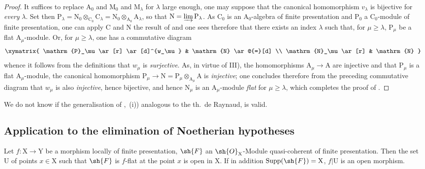 \begin{proof}
It suffices to replace $\mathrm{A}_0$ and $\mathrm{M}_0$ and $\mathrm{M}_\lambda$ for $\lambda$ large enough, one may suppose that the canonical homomorphism $v_\lambda$ is bijective for \emph{every} $\lambda$. Set then $\mathrm{P}_\lambda=\mathrm{N}_0\otimes_{\mathrm{C}_0}\mathrm{C}_\lambda=\mathrm{N}_0\otimes_{\mathrm{A}_0}\mathrm{A}_\lambda$, so that $\mathrm{N}=\varinjlim\mathrm{P}_\lambda$. As $\mathrm{C}_0$ is an $\mathrm{A}_0$-algebra of finite presentation and $\mathrm{P}_0$ a $\mathrm{C}_0$-module of finite presentation, one can apply $\mathrm{C}$ and $\mathrm{N}$ the result of  and one sees therefore that there exists an index $\lambda$ such that, for $\mu\geqslant\lambda$, $\mathrm{P}_\mu$ be a flat $\mathrm{A}_\mu$-module. Or, for $\mu\geqslant\lambda$, one has a commutative diagram
\[
\xymatrix{
  \mathrm{P}_\mu \ar[r] \ar[d]^{w_\mu} & \mathrm{N} \ar@{=}[d] \\
  \mathrm{N}_\mu \ar[r] & \mathrm{N}
}
\]
whence it follows from the definitions that $w_\mu$ is \emph{surjective}. As, in virtue of III), the homomorphisms $\mathrm{A}_\mu\to\mathrm{A}$ are injective and that $\mathrm{P}_\mu$ is a flat $\mathrm{A}_\mu$-module, the canonical homomorphism $\mathrm{P}_\mu\to\mathrm{N}=\mathrm{P}_\mu\otimes_{\mathrm{A}_\mu}\mathrm{A}$ is \emph{injective}; one concludes therefore from the preceding commutative diagram that $w_\mu$ is also \emph{injective}, hence bijective, and hence $\mathrm{N}_\mu$ is an $\mathrm{A}_\mu$-module \emph{flat} for $\mu\geqslant\lambda$, which completes the proof of .
\end{proof}

\begin{remark}[11.2.10]
\label{IV.11.2.10}
We do not know if the generalisation of ,~(i)) analogous to the th.~de Raynaud, is valid.
\end{remark}

\subsection{Application to the elimination of Noetherian hypotheses}
\label{subsection:IV.11.3}


\begin{theorem}[11.3.1]
\label{IV.11.3.1}
Let $f:\mathrm{X}\to\mathrm{Y}$ be a morphism locally of finite presentation, $\sh{F}$ an $\sh{O}_\mathrm{X}$-Module quasi-coherent of finite presentation. Then the set $\mathrm{U}$ of points $x\in\mathrm{X}$ such that $\sh{F}$ is $f$-flat at the point $x$ is open in $\mathrm{X}$. If in addition $\operatorname{Supp}(\sh{F})=\mathrm{X}$, $f|\mathrm{U}$ is an open morphism.
\end{theorem}

